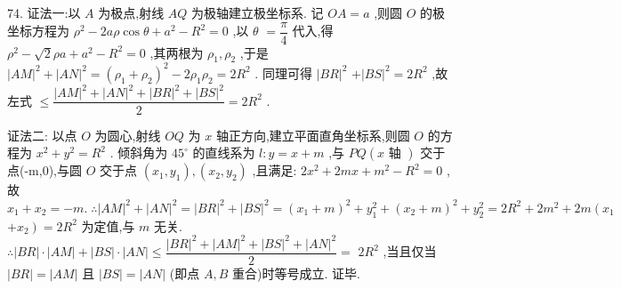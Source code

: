 74. 证法一:以 $A$ 为极点,射线 ${AQ}$ 为极轴建立极坐标系. 记 ${OA} = a$ ,则圆 $O$ 的极坐标方程为 ${\rho }^{2} - {2a\rho }\cos \theta  + {a}^{2} - {R}^{2} = 0$ ,以 $\theta$  $= \dfrac{\pi }{4}$ 代入,得 ${\rho }^{2} - \sqrt{2}{\rho a} + {a}^{2} - {R}^{2} = 0$ ,其两根为 ${\rho }_{1},{\rho }_{2}$ ,于是 ${\left| AM\right| }^{2} + {\left| AN\right| }^{2} = {\left( {\rho }_{1} + {\rho }_{2}\right) }^{2} - 2{\rho }_{1}{\rho }_{2} = 2{R}^{2}$ . 同理可得 ${\left| BR\right| }^{2}$  $+ {\left| BS\right| }^{2} = 2{R}^{2}$ ,故左式 $\leq  \dfrac{{\left| AM\right| }^{2} + {\left| AN\right| }^{2} + {\left| BR\right| }^{2} + {\left| BS\right| }^{2}}{2} = 2{R}^{2}$ .

证法二: 以点 $O$ 为圆心,射线 ${OQ}$ 为 $x$ 轴正方向,建立平面直角坐标系,则圆 $O$ 的方程为 ${x}^{2} + {y}^{2} = {R}^{2}$ . 倾斜角为 ${45}^{ \circ  }$ 的直线系为 $l : y = x + m$ ,与 ${PQ}\left( {x\text{ 轴 }}\right)$ 交于点(-m,0),与圆 $O$ 交于点 $\left( {{x}_{1},{y}_{1}}\right) ,\left( {{x}_{2},{y}_{2}}\right)$ ,且满足: $2{x}^{2} + {2mx} + {m}^{2} - {R}^{2} = 0$ , 故 ${x}_{1} + {x}_{2} =  - m.\;\therefore {\left| AM\right| }^{2} + {\left| AN\right| }^{2} = {\left| BR\right| }^{2} + {\left| BS\right| }^{2} = {\left( {x}_{1} + m\right) }^{2} + {y}_{1}^{2} + {\left( {x}_{2} + m\right) }^{2} + {y}_{2}^{2} = 2{R}^{2} + 2{m}^{2} + {2m}\left( {x}_{1}\right.$  $\left. {+{x}_{2}}\right)  = 2{R}^{2}$ 为定值,与 $m$ 无关. $\therefore \left| {BR}\right|  \cdot  \left| {AM}\right|  + \left| {BS}\right|  \cdot  \left| {AN}\right|  \leq  \dfrac{{\left| BR\right| }^{2} + {\left| AM\right| }^{2} + {\left| BS\right| }^{2} + {\left| AN\right| }^{2}}{2} =$  $2{R}^{2}$ ,当且仅当 $\left| {BR}\right|  = \left| {AM}\right|$ 且 $\left| {BS}\right|  = \left| {AN}\right|$ (即点 $A,B$ 重合)时等号成立. 证毕.

